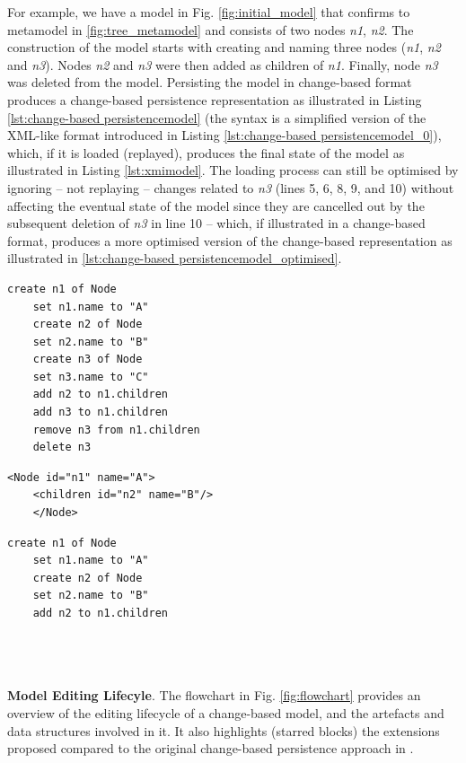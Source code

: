 \documentclass[12pt, a4paper]{report} \usepackage[titletoc]{appendix}
\begin{document}
For example, we have a model in Fig. \ref{fig:initial_model} that confirms to metamodel in \ref{fig:tree_metamodel} and consists of two nodes \emph{n1}, \emph{n2}. The construction of the model starts with creating and naming three nodes (\emph{n1}, \emph{n2} and \emph{n3}). Nodes \emph{n2} and \emph{n3} were then added as children of \emph{n1}. Finally, node \emph{n3} was deleted from the model. Persisting the model in change-based format produces a change-based persistence representation as illustrated in Listing \ref{lst:change-based persistencemodel} (the syntax is a simplified version of the XML-like format introduced in Listing \ref{lst:change-based persistencemodel_0}), which, if it is loaded (replayed), produces the final state of the model as illustrated in Listing \ref{lst:xmimodel}. The loading process can still be optimised by ignoring -- not replaying -- changes related to \emph{n3} (lines 5, 6, 8, 9, and 10) without affecting the eventual state of the model since they are cancelled out by the subsequent deletion of \emph{n3} in line 10 -- which, if illustrated in a change-based format, produces a more optimised version of the change-based representation as illustrated in \ref{lst:change-based persistencemodel_optimised}.

\noindent
\begin{minipage}[t]{0.48\linewidth}
	\begin{lstlisting}[style=eol,caption={Change-based representation of the tree model.},label=lst:change-based persistencemodel]
    create n1 of Node
    set n1.name to "A"      
    create n2 of Node
    set n2.name to "B"      
    create n3 of Node
    set n3.name to "C"      
    add n2 to n1.children   
    add n3 to n1.children
    remove n3 from n1.children   
    delete n3
    \end{lstlisting}
\end{minipage}
\hfill
\begin{minipage}[t]{0.48\linewidth}
	\begin{lstlisting}[style=xmi,caption={State-based representation of the tree model in (simplified) XMI.},label=lst:xmimodel]
    <Node id="n1" name="A">
    <children id="n2" name="B"/>
    </Node>
    \end{lstlisting}
    
    \begin{lstlisting}[style=eol,caption={An optimised version of change-based representation in Listing \ref{lst:change-based persistencemodel}.},label=lst:change-based persistencemodel_optimised]
    create n1 of Node
    set n1.name to "A"
    create n2 of Node
    set n2.name to "B"
    add n2 to n1.children
    \end{lstlisting}
\end{minipage}
\\\\\\
\textbf{Model Editing Lifecyle}. The flowchart in Fig. \ref{fig:flowchart} provides an overview of the editing lifecycle of a change-based model, and the artefacts and data structures involved in it. It also highlights (starred blocks) the extensions proposed compared to the original change-based persistence approach in \cite{yohannis2017turning}.
\end{document}

